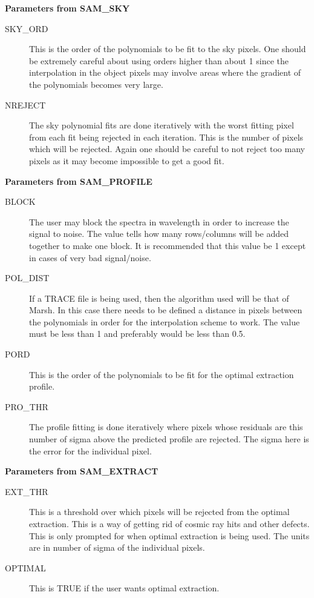 {\bf Parameters from SAM\_SKY}

\begin{description}

\item[SKY\_ORD] This is the order of the polynomials to be fit to the sky
pixels.  One should be extremely careful about using orders higher than about
1 since the interpolation in the object pixels may involve areas where the
gradient of the polynomials becomes very large.

\item[NREJECT]  The sky polynomial fits are done iteratively with the worst
fitting pixel from each fit being rejected in each iteration.  This is the
number of pixels which will be rejected.  Again one should be careful to not
reject too many pixels as it may become impossible to get a good fit.

\end{description}

{\bf Parameters from SAM\_PROFILE}

\begin{description}

\item[BLOCK] The user may block the spectra in wavelength in order to increase
the signal to noise.  The value tells how many rows/columns will be added
together to make one block. It is recommended that this value be 1 except in
cases of very bad signal/noise.

\item[POL\_DIST]  If a TRACE file is being used, then the algorithm used will
be that of Marsh.  In this case there needs to be defined a distance in pixels
between the polynomials in order for the interpolation scheme to work.  The
value must be less than 1 and preferably would be less than 0.5.

\item[PORD] This is the order of the polynomials to be fit for the optimal
extraction profile.

\item[PRO\_THR]  The profile fitting is done iteratively where pixels whose
residuals are this number of sigma above the predicted profile are rejected.
The sigma here is the error for the individual pixel.

\end{description}

{\bf Parameters from SAM\_EXTRACT}

\begin{description}

\item[EXT\_THR] This is a threshold over which pixels will be rejected from the
optimal extraction.  This is a way of getting rid of cosmic ray hits and other
defects.  This is only prompted for when optimal extraction is being used.  The
units are in number of sigma of the individual pixels.

\item[OPTIMAL]  This is TRUE if the user wants optimal extraction.

\end{description}

